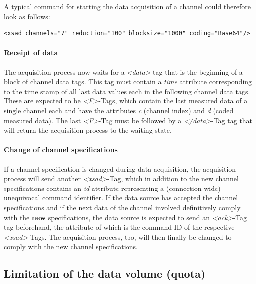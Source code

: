 \documentclass[a4paper,12pt,BCOR6mm,bibtotoc,idxtotoc]{scrbook}
\begin{document}
A typical command for starting the data acquisition of a channel could therefore look as follows:

\begin{lstlisting}[basicstyle=\ttfamily\scriptsize] <xsad channels="7" reduction="100" blocksize="1000" coding="Base64"/> \end{lstlisting}

\paragraph{Receipt of data}

The acquisition process now waits for a \textit{\textless data\textgreater} tag that is the beginning of a block of channel data tags. This tag must contain a \textit{time} attribute corresponding to the time stamp of all last data values each in the following channel data tags. These are expected to be \textit{\textless F\textgreater}-Tags, which contain the last measured data of a single channel each and have the attributes \textit{c} (channel index) and \textit{d} (coded measured data). The last \textit{\textless F\textgreater}-Tag must be followed by a \textit{\textless /data\textgreater}-Tag  tag that will return the acquisition process to the waiting state.

\paragraph{Change of channel specifications} If a channel specification is changed during data acquisition, the acquisition process will send another \textit{\textless xsad\textgreater}-Tag, which in addition to the new channel specifications contains an \textit{id} attribute representing a (connection-wide) unequivocal command identifier. If the data source has accepted the channel specifications and if the next data of the channel involved definitively comply with the \textbf{new} specifications, the data source is expected to send an \textit{\textless ack\textgreater}-Tag  tag beforehand, the attribute of which is the command ID of the respective \textit{\textless xsad\textgreater}-Tags. The acquisition process, too, will then finally be changed to comply with the new channel specifications.


\subsection{Limitation of the data volume (quota)} \label{sec:dlsd_logger_quota} 
\end{document}
